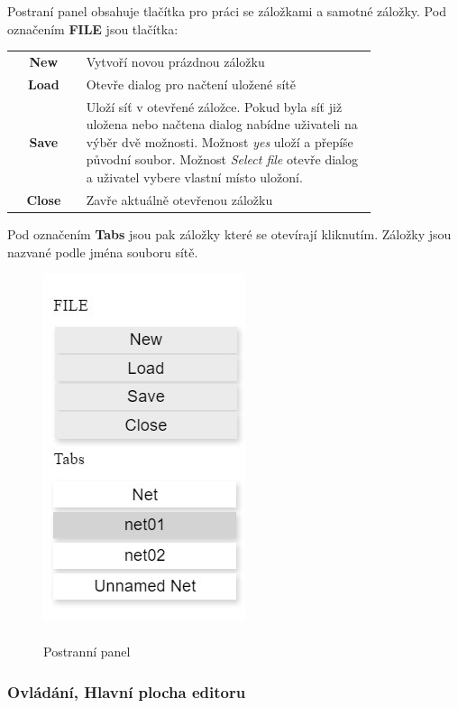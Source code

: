 \documentclass[
  biblatex,
  glossaries,
  index
]{kidiplom}
\begin{document}
Postraní panel obsahuje tlačítka pro práci se záložkami a 
samotné záložky. Pod označením \textbf{FILE} jsou tlačítka:
\begin{center}
  \begin{tabular}{c p{0.8\linewidth}}
    \textbf{New}    & Vytvoří novou prázdnou záložku \\
    \textbf{Load}   & Otevře dialog pro načtení uložené sítě \\
    \textbf{Save}   & Uloží síť v otevřené záložce. Pokud byla síť již uložena 
      nebo načtena dialog nabídne uživateli na výběr dvě možnosti.
      Možnost \textit{yes} uloží a přepíše původní soubor.
      Možnost \textit{Select file} otevře dialog 
      a uživatel vybere vlastní místo uložoní. \\
    \textbf{Close}  & Zavře aktuálně otevřenou záložku \\
  \end{tabular}
\end{center}

Pod označením \textbf{Tabs} jsou pak záložky které se otevírají kliknutím.
Záložky jsou nazvané podle jména souboru sítě.

\begin{figure}[h]
  \centering
  \includegraphics{editor_panel}
  \caption{\\Postranní panel}\label{fig:Postranní panel}
\end{figure}

\subsubsection{Ovládání, Hlavní plocha editoru}\label{hlavní plocha}
\end{document}
